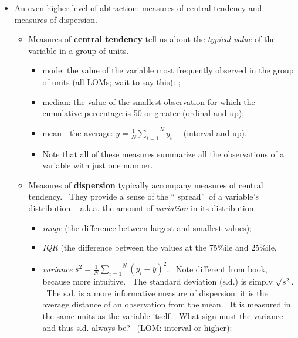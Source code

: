 \documentclass[11pt]{article}
\begin{document}
\begin{itemize}
\item An even higher level of abtraction: measures of central tendency and
measures of dispersion.

\begin{itemize}
\item Measures of \textbf{central tendency }tell us about the \textit{%
typical value }of the variable in a group of units.

\begin{itemize}
\item mode: the value of the variable most frequently observed in the group
of units (all LOMs; wait to say this): ;

\item median: the value of the smallest observation for which the cumulative
percentage is 50 or greater (ordinal and up);

\item mean - the average: $\overline{y}=\frac{1}{N}\overset{N}{\underset{i=1}%
{\sum }}y_{i}$ \ \ (interval and up). \ 

\item Note that all of these measures summarize all the observations of a
variable with just one number.
\end{itemize}

\item Measures of \textbf{dispersion} typically accompany measures of
central tendency. \ They provide a sense of the \textquotedblleft
spread\textquotedblright\ of a variable's distribution -- a.k.a. the amount
of \textit{variation }in its distribution.

\begin{itemize}
\item \textit{range }(the difference between largest and smallest values);

\item \textit{IQR} (the difference between the values at the 75\%ile and
25\%ile,

\item \textit{variance} $s^{2}=\frac{1}{N}\overset{N}{\underset{i=1}{\sum }}%
(y_{i}-\overline{y})^{2}.$ \ Note different from book, because more
intuitive. \ The standard deviation (s.d.) is simply $\sqrt{s^{2}}.$ \ The
s.d. is a more informative measure of dispersion: it is the average distance
of an observation from the mean. \ It is measured in the same units as the
variable itself. \ What sign must the variance and thus s.d. always be? \
(LOM: interval or higher):
\end{itemize}


\end{itemize}
\end{itemize}
\end{document}
